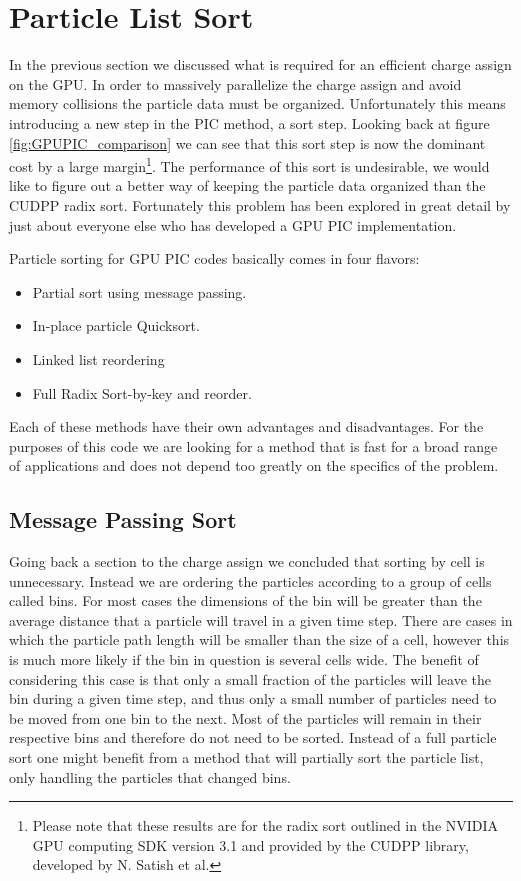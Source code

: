 	\section{Particle List Sort}
		In the previous section we discussed what is required for an efficient charge assign on the GPU. In order to massively parallelize the charge assign and avoid memory collisions the particle data must be organized. Unfortunately this means introducing a new step in the PIC method, a sort step. Looking back at figure \ref{fig:GPUPIC_comparison} we can see that this sort step is now the dominant cost by a large margin\footnote{Please note that these results are for the radix sort outlined in the NVIDIA GPU computing SDK version 3.1 and provided by the CUDPP library, developed by N. Satish et al.\cite{Satish2009}}. The performance of this sort is undesirable, we would like to figure out a better way of keeping the particle data organized than the CUDPP radix sort. Fortunately this problem has been explored in great detail by just about everyone else who has developed a GPU PIC implementation. 

Particle sorting for GPU PIC codes basically comes in four flavors:
\begin{itemize}
\item Partial sort using message passing. \cite{Kong2011}\cite{Decyk2011}
\item In-place particle Quicksort. \cite{Stantchev2008}
\item Linked list reordering \cite{Burau2010}
\item Full Radix Sort-by-key and reorder. \cite{Abreu2011}
\end{itemize}
Each of these methods have their own advantages and disadvantages. For the purposes of this code we are looking for a method that is fast for a broad range of applications and does not depend too greatly on the specifics of the problem.



	\subsection{Message Passing Sort}
	Going back a section to the charge assign we concluded that sorting by cell is unnecessary. Instead we are ordering the particles according to a group of cells called bins. For most cases the dimensions of the bin will be greater than the average distance that a particle will travel in a given time step. There are cases in which the particle path length will be smaller than the size of a cell, however this is much more likely if the bin in question is several cells wide. The benefit of considering this case is that only a small fraction of the particles will leave the bin during a given time step, and thus only a small number of particles need to be moved from one bin to the next. Most of the particles will remain in their respective bins and therefore do not need to be sorted. Instead of a full particle sort one might benefit from a method that will partially sort the particle list, only handling the particles that changed bins. 


